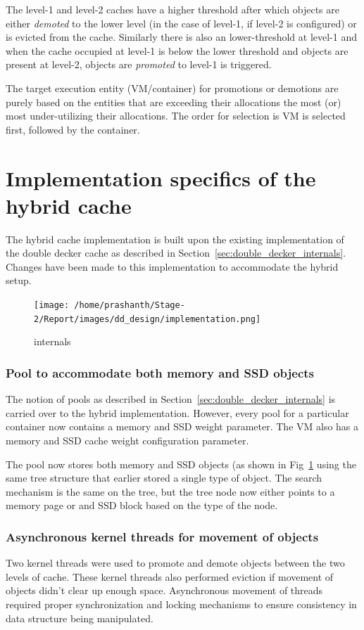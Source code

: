 	The level-1 and level-2 caches have a higher threshold after which objects are either \textit{demoted} to the 
	lower level (in the case of level-1, if level-2 is configured) or is evicted from the cache. Similarly
	there is also an lower-threshold at level-1 and when the cache occupied at level-1 is below the lower threshold
	and objects are present at level-2, objects are \textit{promoted} to level-1 is triggered.
	
	The target execution entity (VM/container) for promotions or demotions are purely based on the entities that
	are exceeding their allocations the most (or) most under-utilizing their allocations. The order for selection
	is VM is selected first, followed by the container.
      
	
  \section{Implementation specifics of the hybrid cache}

    The hybrid cache implementation is built upon the existing implementation of the double decker cache as described in 
    Section~\ref{sec:double_decker_internals}. Changes have been made to this implementation to accommodate the hybrid setup.
    
    \begin{figure}
      \centering
      \texttt{[image: /home/prashanth/Stage-2/Report/images/dd\_design/implementation.png]}
      \caption{\dd{} internals}
      \label{img:dd_internals}
    \end{figure}
  
      \subsubsection{Pool to accommodate both memory and SSD objects}
	The notion of pools as described in Section~\ref{sec:double_decker_internals} is carried over to the hybrid implementation.
	However, every pool for a particular container now contains a memory and SSD weight parameter. The VM also has a memory
	and SSD cache weight configuration parameter.
	
	The pool now stores both memory and SSD objects (as shown in Fig~\ref{img:dd_internals} using the same tree structure 
	that earlier stored a single type of object. The search mechanism is the same on the tree, but the tree node now either 
	points to a memory page or and SSD block based on the type of the node.  
	
	    
      \subsubsection{Asynchronous kernel threads for movement of objects}
	Two kernel threads were used to promote and demote objects between the two levels of cache. These kernel threads also
	performed eviction if movement of objects didn't clear up enough space. Asynchronous movement of threads required 
	proper synchronization and locking mechanisms to ensure consistency in data structure being manipulated. 
      
